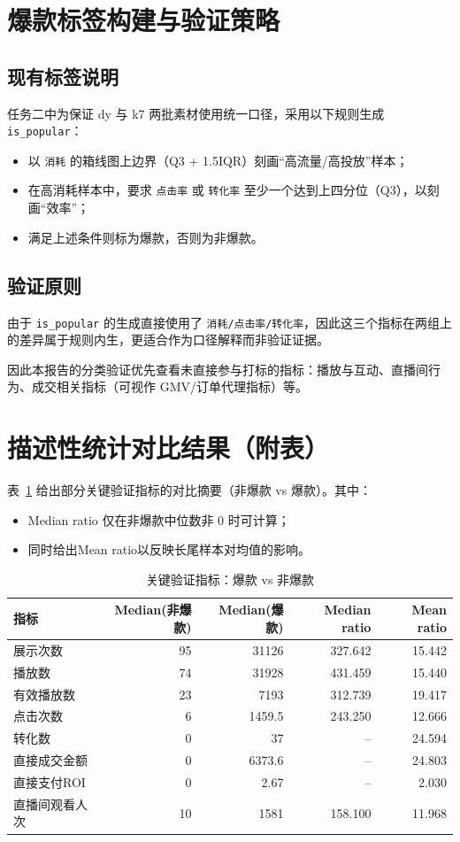 \documentclass[UTF8,a4paper,11pt]{ctexart}
\begin{document}
\section{爆款标签构建与验证策略}
\subsection{现有标签说明}
任务二中为保证 dy 与 k7 两批素材使用统一口径，采用以下规则生成 \texttt{is\_popular}：
\begin{itemize}
  \item 以 \texttt{消耗} 的箱线图上边界（Q3 + 1.5IQR）刻画``高流量/高投放''样本；
  \item 在高消耗样本中，要求 \texttt{点击率} 或 \texttt{转化率} 至少一个达到上四分位（Q3），以刻画``效率''；
  \item 满足上述条件则标为爆款，否则为非爆款。
\end{itemize}

\subsection{验证原则}
由于 \texttt{is\_popular} 的生成直接使用了 \texttt{消耗/点击率/转化率}，因此这三个指标在两组上的差异属于规则内生，更适合作为口径解释而非验证证据。

因此本报告的分类验证优先查看未直接参与打标的指标：播放与互动、直播间行为、成交相关指标（可视作 GMV/订单代理指标）等。

\section{描述性统计对比结果（附表）}
表~\ref{tab:effect} 给出部分关键验证指标的对比摘要（非爆款 vs 爆款）。其中：
\begin{itemize}
  \item Median ratio 仅在非爆款中位数非 0 时可计算；
  \item 同时给出Mean ratio以反映长尾样本对均值的影响。
\end{itemize}

\begin{table}[h]
\centering
\caption{关键验证指标：爆款 vs 非爆款}
\label{tab:effect}
\begin{tabular}{lrrrr}
\toprule
指标 & Median(非爆款) & Median(爆款) & Median ratio & Mean ratio \\
\midrule
展示次数 & 95 & 31126 & 327.642 & 15.442 \\
播放数 & 74 & 31928 & 431.459 & 15.440 \\
有效播放数 & 23 & 7193 & 312.739 & 19.417 \\
点击次数 & 6 & 1459.5 & 243.250 & 12.666 \\
转化数 & 0 & 37 & -- & 24.594 \\
直接成交金额 & 0 & 6373.6 & -- & 24.803 \\
直接支付ROI & 0 & 2.67 & -- & 2.030 \\
直播间观看人次 & 10 & 1581 & 158.100 & 11.968 \\
\bottomrule
\end{tabular}
\end{table}
\end{document}
